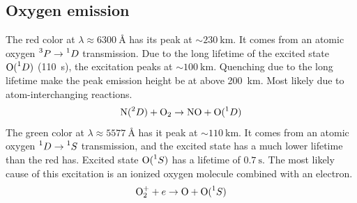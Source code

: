 \subsection{Oxygen emission}
The {\color{red}red} color at \(\lambda\approx\SI{6300}{\angstrom}\) has its peak at \(\sim\SI{230}{\kilo\metre}\). It comes from an atomic oxygen \(\prescript{3}{}{P}\rightarrow\prescript{1}{}{D}\) transmission. Due to the long lifetime of the excited state \(\textnormal{O}(\prescript{1}{}{D})\) (\SI{110}{\second}), the excitation peaks at \(\sim\SI{100}{\kilo\metre}\). Quenching due to the long lifetime make the peak emission height be at above \SI{200}{\kilo\metre}. Most likely due to atom-interchanging reactions. \begin{equation*}
    \textnormal{N}(\prescript{2}{}{D})+\textnormal{O}_2\rightarrow \textnormal{NO}+\textnormal{O}(\prescript{1}{}{D})
\end{equation*}
The {\color{green}green} color at \(\lambda\approx\SI{5577}{\angstrom}\) has it peak at \(\sim\SI{110}{\kilo\metre}\). It comes from an atomic oxygen \(\prescript{1}{}{D}\rightarrow\prescript{1}{}{S}\) transmission, and the excited state has a much lower lifetime than the red has. Excited state \(\textnormal{O}(\prescript{1}{}{S})\) has a lifetime of \(\SI{0.7}{\second}\). The most likely cause of this excitation is an ionized oxygen molecule combined with an electron.
\begin{equation*}
    \textnormal{O}_2^+ + e\rightarrow \textnormal{O}+\textnormal{O}(\prescript{1}{}{S})
\end{equation*}


